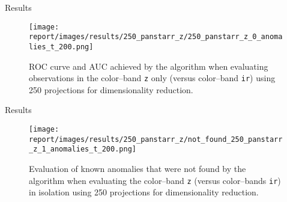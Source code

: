 \begin{frame}{Results}
    \begin{figure}[H]
        \centering
        \texttt{[image: report/images/results/250\_panstarr\_z/250\_panstarr\_z\_0\_anomalies\_t\_200.png]}
        \caption{ROC curve and AUC achieved by the \mlblink algorithm when evaluating observations in the \panstarrs color--band \texttt{z} only (versus \usno color--band \texttt{ir}) using 250 projections for dimensionality reduction.}
        \label{fig:evaluation:roc:panstarrs:z}
    \end{figure}
\end{frame}

\begin{frame}{Results}
    \begin{figure}[H]
        \centering
        \texttt{[image: report/images/results/250\_panstarr\_z/not\_found\_250\_panstarr\_z\_1\_anomalies\_t\_200.png]}
        \caption{Evaluation of known anomalies that were not found by the \mlblink algorithm when evaluating the \panstarrs color--band \texttt{z} (versus \usno color--bands \texttt{ir}) in isolation using 250 projections for dimensionality reduction.}
    \end{figure}
\end{frame}



